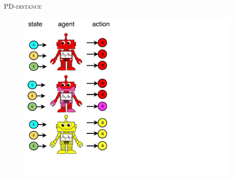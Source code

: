 \documentclass[french,handout]{beamer}
\begin{document}
    \begin{frame}{\textsc{PD-distance}}
        \begin{figure}
            \begin{center}
                \includegraphics[width=1.0\textwidth]{img/pddistance0.pdf}
            \end{center}
        \end{figure}
    \end{frame}
\end{document}
